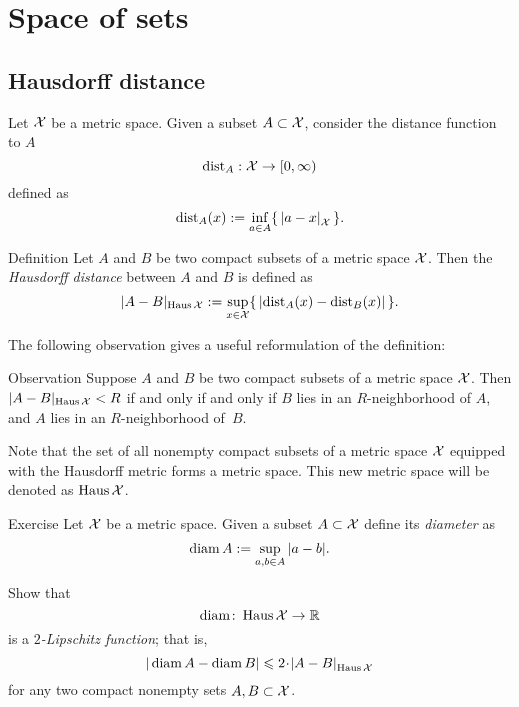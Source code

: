 \chapter{Space of sets}

\section{Hausdorff distance}

Let $\mathcal{X}$ be a metric space.
Given a subset $A\subset \mathcal{X}$,
consider the distance function to $A$
$$\mathrm{dist}_A: \mathcal{X} \to [0,\infty)$$
defined as 
$$\distfun_A(x)
\df
\inf_{a\in A}\{\,\dist ax{\spc{X}}\,\}.$$

\begin{thm}{Definition}\label{def:hausdorff-convergence}
Let $A$ and $B$ be two compact subsets of a metric space $\mathcal{X}$.
Then the \emph{Hausdorff distance} between $A$ and $B$ is defined as 
$$|A-B|_{\operatorname{\rm Haus}\nolimits\mathcal{X}}
\mathrel{:=}
\sup_{x\in \mathcal{X}}\{\,|\mathrm{dist}_A(x)-\mathrm{dist}_B(x)|\,\}.
$$

\end{thm}

The following observation gives a useful reformulation of the definition:

\begin{thm}{Observation}\label{obs:Haus-nbhds}
Suppose $A$ and $B$ be two compact subsets of a metric space $\mathcal{X}$.
Then $|A-B|_{\operatorname{\rm Haus}\nolimits\mathcal{X}}< R$ if and only if and only if 
$B$ lies in an $R$-neighborhood of $A$, 
and 
$A$ lies in an $R$-neighborhood of~$B$.
\end{thm}



Note that the set of all nonempty compact subsets of a metric space $\mathcal{X}$ equipped with the Hausdorff metric forms a metric space.
This new metric space will be denoted as $\operatorname{\rm Haus}\nolimits\mathcal{X}$.


\begin{thm}{Exercise}\label{ex:diam}
Let $\mathcal{X}$ be a metric space.
Given a subset $A\subset \mathcal{X}$ define its \emph{diameter} as 
$$\operatorname{\rm diam}\nolimits A\mathrel{:=}\sup_{a,b\in A} |a-b|.$$

Show that 
$$\operatorname{\rm diam}\nolimits\colon\operatorname{\rm Haus}\nolimits\mathcal{X}\to \mathbb{R}$$ 
is a \emph{$2$-Lipschitz function};
that is,
\[|\diam A-\diam B|\le 2\cdot\dist{A}{B}{\Haus\spc{X}}\]
for any two compact nonempty sets $A,B\subset\mathcal{X}$.
\end{thm}


